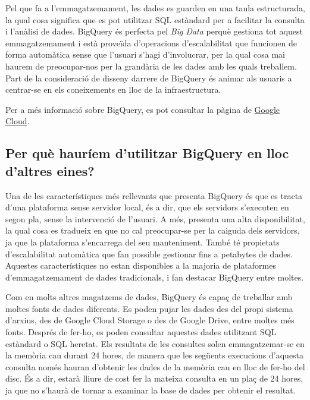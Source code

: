 \documentclass[12pt,longbibliography]{article}
\theoremstyle{definition}
\theoremstyle{remark}
\begin{document}
Pel que fa a l’emmagatzemament, les dades es guarden en una taula estructurada, la qual cosa significa que es pot utilitzar SQL estàndard per a facilitar la consulta i l’anàlisi de dades. BigQuery és perfecta pel \textit{Big Data} perquè gestiona tot aquest emmagatzemament i està proveïda d’operacions d’escalabilitat que funcionen de forma automàtica sense que l’usuari s’hagi d’involucrar,  per la qual cosa mai haurem de preocupar-nos per la grandària de les dades amb les quals treballem. Part de la consideració de disseny darrere de BigQuery és animar als usuaris a centrar-se en els coneixements en lloc de la infraestructura. 

\noindent
Per a més informació sobre BigQuery, es pot consultar la pàgina de \href{https://cloud.google.com/bigquery/docs/introduction}{Google Cloud}.

\subsection{Per què hauríem d'utilitzar BigQuery en lloc d'altres eines?}

Una de les característiques més rellevants que presenta BigQuery és que es tracta d'una plataforma sense servidor local, és a dir, que els servidors s'executen en segon pla, sense la intervenció de l'usuari. A més, presenta una alta disponibilitat, la qual cosa es tradueix en que no cal preocupar-se per la caiguda dels servidors, ja que la plataforma s'encarrega del seu manteniment. També té propietats d'escalabilitat automàtica que fan possible gestionar fins a petabytes de dades. Aquestes característiques no estan disponibles a la majoria de plataformes d'emmagatzemament de dades tradicionals, i fan destacar BigQuery entre moltes.



Com en molts altres magatzems de dades, BigQuery és capaç de treballar amb moltes fonts de dades diferents. Es poden pujar les dades des del propi sistema d'arxius, des de Google Cloud Storage o des de Google Drive, entre moltes més fonts. Després de fer-ho, es poden consultar aquestes dades utilitzant SQL estàndard o SQL heretat. Els resultats de les consultes solen emmagatzemar-se en la memòria cau durant 24 hores, de manera que les següents execucions d'aquesta consulta només hauran d'obtenir les dades de la memòria cau en lloc de fer-ho del disc. És a dir, estarà lliure de cost fer la mateixa consulta en un plaç de 24 hores, ja que no s'haurà de tornar a examinar la base de dades per obtenir el resultat.
\end{document}
